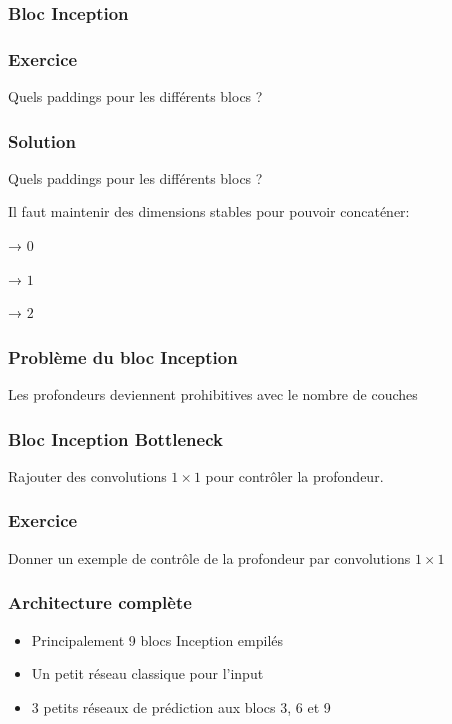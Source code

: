 \documentclass{formation}
\begin{document}
\begin{frame}
  \frametitle{Bloc Inception}
\end{frame}

\begin{frame}
  \frametitle{Exercice}
  Quels paddings pour les différents blocs ?
\end{frame}

\begin{frame}
  \frametitle{Solution}
  Quels paddings pour les différents blocs ?

  Il faut maintenir des dimensions stables pour pouvoir concaténer:
  \pause
  \begin{description}[<+->]
  \item[$1 \times 1$] → $0$
  \item[$3 \times 3$] → $1$
  \item[$5 \times 5$] → $2$
  \end{description}
\end{frame}

\begin{frame}
  \frametitle{Problème du bloc Inception}
  Les profondeurs deviennent prohibitives avec le nombre de couches
\end{frame}

\begin{frame}
  \frametitle{Bloc Inception \og Bottleneck\fg}

  Rajouter des convolutions $1 \times 1$ pour contrôler la profondeur.
\end{frame}

\begin{frame}
  \frametitle{Exercice}

  Donner un exemple de contrôle de la profondeur par convolutions $1
  \times 1$
\end{frame}

\begin{frame}
  \frametitle{Architecture complète}
  \begin{itemize}
  \item Principalement 9 blocs Inception empilés
    
  \item Un \og petit\fg{} réseau classique pour l'input
  \item 3 \og petits \fg{} réseaux de prédiction aux blocs 3, 6 et 9
  \end{itemize}
\end{frame}
\end{document}
